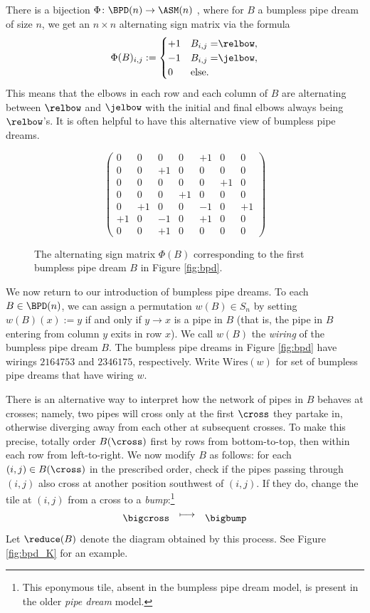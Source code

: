 There is a bijection $\Phi\colon \BPD(n) \to \ASM(n)$ \cite{Wei21},
where for $B$ a bumpless pipe dream of size $n$, we get an $n\times n$ alternating sign matrix via the formula \[
    \Phi(B)_{i,j} := \begin{cases}
        +1 & B_{i,j} = $\relbow$, \\
        -1 & B_{i,j} = $\jelbow$, \\
        0 & \text{else.}
    \end{cases}
\]
This means that the elbows in each row and each column of $B$ are alternating between $\relbow$ and $\jelbow$ with the initial and final elbows always being $\relbow$'s.
It is often helpful to have this alternative view of bumpless pipe dreams.

\begin{figure}
    \centering
    \[\begin{pmatrix}
     0& 0& 0& 0&+1& 0& 0\\
     0& 0&+1& 0& 0& 0& 0\\
     0& 0& 0& 0& 0&+1& 0\\
     0& 0& 0&+1& 0& 0& 0\\
     0&+1& 0& 0&-1& 0&+1\\
    +1& 0&-1& 0&+1& 0& 0\\
     0& 0&+1& 0& 0& 0& 0
    \end{pmatrix}\]
    \caption{The alternating sign matrix $\Phi(B)$ corresponding to the first bumpless pipe dream $B$ in Figure \ref{fig:bpd}.}
    \label{fig:asm}
\end{figure}

We now return to our introduction of bumpless pipe dreams.
To each $B\in \BPD(n)$, we can assign a permutation $w(B)\in S_n$ by setting $w(B)(x) := y$ if and only if $y\to x$ is a pipe in $B$ (that is, the pipe in $B$ entering from column $y$ exits in row $x$).
We call $w(B)$ the \textit{wiring} of the bumpless pipe dream $B$.
The bumpless pipe dreams in Figure \ref{fig:bpd} have wirings $2164753$ and $2346175$, respectively.
Write $\mbox{Wires}(w)$ for set of bumpless pipe dreams that have wiring $w$.

There is an alternative way to interpret how the network of pipes in $B$ behaves at crosses; namely, two pipes will cross only at the first $\cross$ they partake in, otherwise diverging away from each other at subsequent crosses.
To make this precise, totally order $B(\cross)$ first by rows from bottom-to-top, then within each row from left-to-right.
We now modify $B$ as follows:
for each $(i,j)\in B(\cross)$ in the prescribed order, check if the pipes passing through $(i,j)$ also cross at another position southwest of $(i,j)$.
If they do, change the tile at $(i,j)$ from a cross to a \textit{bump}:\footnote{
    This eponymous tile, absent in the bumpless pipe dream model, is present in the older \textit{pipe dream} model.
} \[
    \bigcross\quad
    \raisebox{4pt}{$\longmapsto$}\quad
    \bigbump
\]
Let $\reduce(B)$ denote the diagram obtained by this process.
See Figure \ref{fig:bpd_K} for an example.

